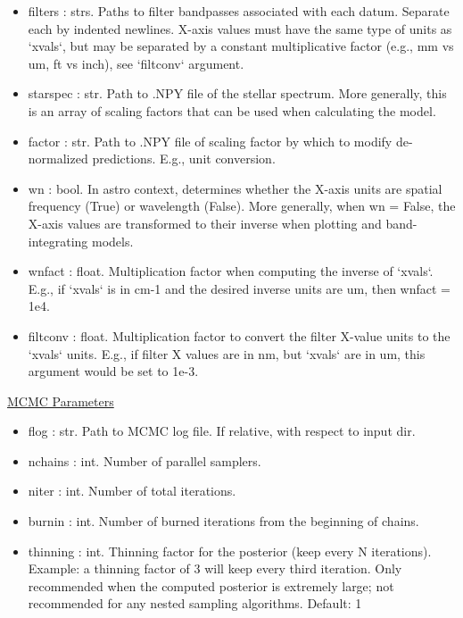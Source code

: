 \documentclass[letterpaper, 12pt]{article}
\begin{document}
\begin{itemize}
\item filters     : strs. Paths to filter bandpasses associated with each datum. 
                    Separate each by indented newlines.
                    X-axis values must have the same type of units as `xvals`,
                    but may be separated by a constant multiplicative factor
                    (e.g., mm vs um, ft vs inch), see `filtconv` argument.
\item starspec    : str.  Path to .NPY file of the stellar spectrum.
                    More generally, this is an array of scaling factors that 
                    can be used when calculating the model.
\item factor      : str.  Path to .NPY file of scaling factor by which 
                    to modify de-normalized predictions. 
                    E.g., unit conversion.
\item wn          : bool. In astro context, determines whether the X-axis units are 
                    spatial frequency (True) or wavelength (False).
                    More generally, when wn = False, the X-axis values are 
                    transformed to their inverse when plotting and 
                    band-integrating models.  
\item wnfact      : float. Multiplication factor when computing the inverse of 
                     `xvals`.
                     E.g., if `xvals` is in cm-1 and the desired inverse units 
                     are um, then wnfact = 1e4.
\item filtconv    : float. Multiplication factor to convert the filter 
                     X-value units to the `xvals` units.
                     E.g., if filter X values are in nm, but `xvals` are in um, 
                     this argument would be set to 1e-3.
\end{itemize}


\noindent \underline{MCMC Parameters}
\begin{itemize}
\item flog        : str.  Path to MCMC log file. 
                          If relative, with respect to input dir.
\item nchains     : int.  Number of parallel samplers.
\item niter       : int.  Number of total iterations.
\item burnin      : int.  Number of burned iterations from the beginning of 
                          chains.
\item thinning    : int.  Thinning factor for the posterior (keep every N iterations). Example: a thinning factor of 3 will keep every third iteration.  Only recommended when the computed posterior is extremely large; not recommended for any nested sampling algorithms.  Default: 1
\end{itemize}
\end{document}
